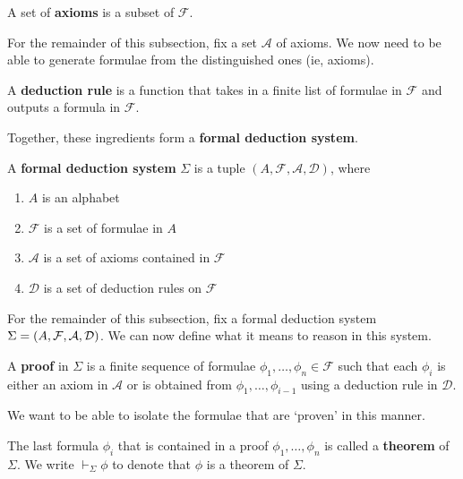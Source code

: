 \begin{boxdefinition}[Axioms]
    A set of \textbf{axioms} is a subset of $\mathcal{F}$.
\end{boxdefinition}

For the remainder of this subsection, fix a set $\mathcal{A}$ of axioms. We now need to be able to generate formulae from the distinguished ones (ie, axioms).

\begin{boxdefinition}
    A \textbf{deduction rule} is a function that takes in a finite list of formulae in $\mathcal{F}$ and outputs a formula in $\mathcal{F}$.
\end{boxdefinition}

Together, these ingredients form a \textbf{formal deduction system}.

\begin{boxdefinition}
    A \textbf{formal deduction system} $\Sigma$ is a tuple $(A, \mathcal{F}, \mathcal{A}, \mathcal{D})$, where
    \begin{enumerate}
        \item $A$ is an alphabet
        \item $\mathcal{F}$ is a set of formulae in $A$
        \item $\mathcal{A}$ is a set of axioms contained in $\mathcal{F}$
        \item $\mathcal{D}$ is a set of deduction rules on $\mathcal{F}$
    \end{enumerate}
\end{boxdefinition}

For the remainder of this subsection, fix a formal deduction system $\Sigma = \left( A, \mathcal{F}, \mathcal{A}, \mathcal{D} \right)$. We can now define what it means to reason in this system.

\begin{boxdefinition}[Proof]
    A \textbf{proof} in $\Sigma$ is a finite sequence of formulae $\phi_1, \ldots, \phi_n \in \mathcal{F}$ such that each $\phi_i$ is either an axiom in $\mathcal{A}$ or is obtained from $\phi_1, \ldots, \phi_{i-1}$ using a deduction rule in $\mathcal{D}$.
\end{boxdefinition}

We want to be able to isolate the formulae that are `proven' in this manner.

\begin{boxdefinition}[Theorem]\label{Ch1:Def:Thm}
    The last formula $\phi_i$ that is contained in a proof $\phi_1, \ldots, \phi_n$ is called a \textbf{theorem} of $\Sigma$. We write $\vdash_{\Sigma} \phi$ to denote that $\phi$ is a theorem of $\Sigma$.
\end{boxdefinition}

